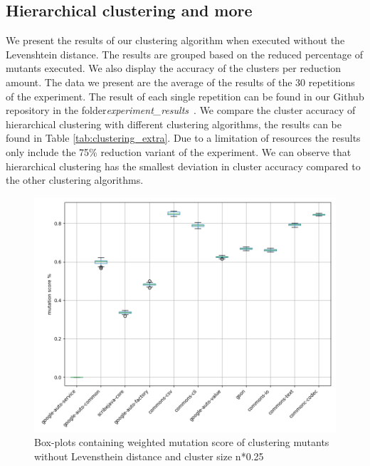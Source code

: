 \documentclass[conference,draftclsnofoot,onecolumn]{IEEEtran}
\begin{document}
\subsection{Hierarchical clustering and more}
We present the results of our clustering algorithm when executed without the Levenshtein distance.
The results are grouped based on the reduced percentage of mutants executed.
We also display the accuracy of the clusters per reduction amount.
The data we present are the average of the results of the 30 repetitions of the experiment.
The result of each single repetition can be found in our Github repository in the folder\textit{experiment{\_}results}~\cite{rbasarat-repo}.
We compare the cluster accuracy of hierarchical clustering with different clustering algorithms, the results can be found in Table \ref{tab:clustering_extra}. 
Due to a limitation of resources the results only include the 75\% reduction variant of the experiment.
We can observe that hierarchical clustering has the smallest deviation in cluster accuracy compared to the other clustering algorithms.

\begin{figure}[ht]
\includegraphics[width=0.5 \textwidth]{images/boxplot_summary/boxplot_hc_no_distance_0.25.png}
\caption{\label{box:clustering_no_distance_25}Box-plots containing weighted mutation score of clustering mutants without Levensthein distance and cluster size n*0.25}
\end{figure}
\end{document}

